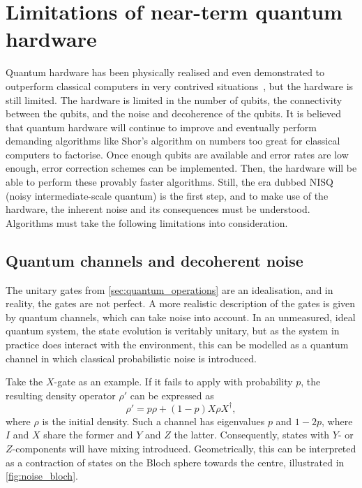 \section{Limitations of near-term quantum hardware}
\label{sec:nisq}
Quantum hardware has been physically realised and even demonstrated to outperform classical computers in very contrived situations~\autocite{arute2019, zhong2020, madsen2022}, but the hardware is still limited.
The hardware is limited in the number of qubits, the connectivity between the qubits, and the noise and decoherence of the qubits.
It is believed that quantum hardware will continue to improve and eventually perform demanding algorithms like Shor's algorithm on numbers too great for classical computers to factorise.
Once enough qubits are available and error rates are low enough, error correction schemes can be implemented.
Then, the hardware will be able to perform these provably faster algorithms.
Still, the era dubbed NISQ (noisy intermediate-scale quantum) is the first step, and to make use of the hardware, the inherent noise and its consequences must be understood.
Algorithms must take the following limitations into consideration.

\subsection{Quantum channels and decoherent noise}
The unitary gates from \cref{sec:quantum_operations} are an idealisation, and in reality, the gates are not perfect.
A more realistic description of the gates is given by quantum channels, which can take noise into account.
In an unmeasured, ideal quantum system, the state evolution is veritably unitary, but as the system in practice does interact with the environment, this can be modelled as a quantum channel in which classical probabilistic noise is introduced.

Take the $X$-gate as an example.
If it fails to apply with probability $p$, the resulting density operator $\rho'$ can be expressed as
\begin{equation}
  \rho' = p\rho + (1-p)X\rho X^\dagger,
\end{equation}
where $\rho$ is the initial density.
Such a channel has eigenvalues $p$ and $1-2p$, where $I$ and $X$ share the former and $Y$ and $Z$ the latter.
Consequently, states with $Y$- or $Z$-components will have mixing introduced.
Geometrically, this can be interpreted as a contraction of states on the Bloch sphere towards the centre, illustrated in \cref{fig:noise_bloch}.

